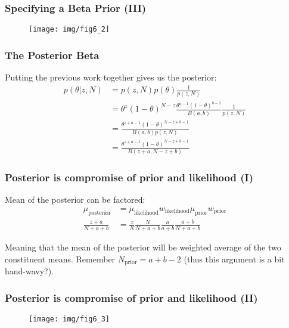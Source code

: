 \documentclass[usenames,dvipsnames,table]{beamer}
\begin{document}



\begin{frame}
\frametitle{Specifying a Beta Prior (III)}
\begin{figure}
\centering
\texttt{[image: img/fig6\_2]}
\end{figure}
\end{frame}




\begin{frame}
\frametitle{The Posterior Beta}

Putting the previous work together gives us the posterior:
\begin{align*}
p(\theta| z, N) &= p(z, N) p(\theta) \frac{1}{p(z, N)} \\
                &= \theta^{z}(1-\theta)^{N-z}
                   \frac{\theta^{a-1}(1-\theta)^{b-1}}
                       {B(a,b)} \frac{1}{p(z, N)} \\
                &= \frac{\theta^{z+a-1}(1-\theta)^{N-z+b-1}}
                        {B(a,b)p(z, N)} \\
                &= \frac{\theta^{z+a-1}(1-\theta)^{N-z+b-1}}
                        {B(z+a, N-z+b)}
\end{align*}
\end{frame}




\begin{frame}
\frametitle{Posterior is compromise of prior and likelihood (I)}

Mean of the posterior can be factored:
\begin{align*}
\mu_{\text{posterior}} &= \mu_{\text{likelihood}} w_{\text{likelihood}}
                          \mu_{\text{prior}} w_{\text{prior}}\\
\frac{z+a}{N+a+b} &= \frac{z}{N} \frac{N}{N+a+b} \frac{a}{a+b} \frac{a+b}{N+a+b} \tag{6.9}
\end{align*}

Meaning that the mean of the posterior will be weighted average of the two constituent means. Remember $N_\text{prior}=a+b-2$ (thus this argument is a bit hand-wavy?).
\end{frame}





\begin{frame}
\frametitle{Posterior is compromise of prior and likelihood (II)}
\begin{figure}
\centering
\texttt{[image: img/fig6\_3]}
\end{figure}
\end{frame}
\end{document}
